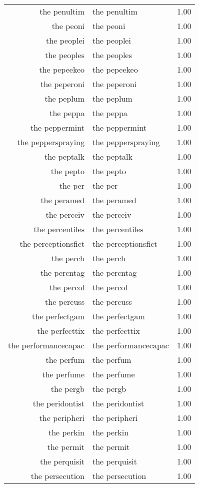 \begin{table}[ht]
\begin{tabular}{rlr}
  the penultim & the penultim & 1.00 \\ 
  the peoni & the peoni & 1.00 \\ 
  the peoplei & the peoplei & 1.00 \\ 
  the peoples & the peoples & 1.00 \\ 
  the pepeekeo & the pepeekeo & 1.00 \\ 
  the peperoni & the peperoni & 1.00 \\ 
  the peplum & the peplum & 1.00 \\ 
  the peppa & the peppa & 1.00 \\ 
  the peppermint & the peppermint & 1.00 \\ 
  the pepperspraying & the pepperspraying & 1.00 \\ 
  the peptalk & the peptalk & 1.00 \\ 
  the pepto & the pepto & 1.00 \\ 
  the per & the per & 1.00 \\ 
  the peramed & the peramed & 1.00 \\ 
  the perceiv & the perceiv & 1.00 \\ 
  the percentiles & the percentiles & 1.00 \\ 
  the perceptionsfict & the perceptionsfict & 1.00 \\ 
  the perch & the perch & 1.00 \\ 
  the percntag & the percntag & 1.00 \\ 
  the percol & the percol & 1.00 \\ 
  the percuss & the percuss & 1.00 \\ 
  the perfectgam & the perfectgam & 1.00 \\ 
  the perfecttix & the perfecttix & 1.00 \\ 
  the performancecapac & the performancecapac & 1.00 \\ 
  the perfum & the perfum & 1.00 \\ 
  the perfume & the perfume & 1.00 \\ 
  the pergb & the pergb & 1.00 \\ 
  the peridontist & the peridontist & 1.00 \\ 
  the peripheri & the peripheri & 1.00 \\ 
  the perkin & the perkin & 1.00 \\ 
  the permit & the permit & 1.00 \\ 
  the perquisit & the perquisit & 1.00 \\ 
  the persecution & the persecution & 1.00 \\ 

\end{tabular}
\end{table}
